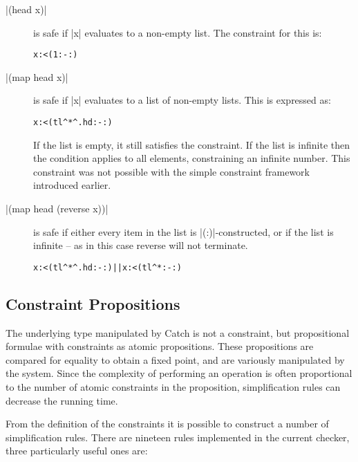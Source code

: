 \documentclass[preprint]{sigplanconf}
\newcommand{\C}[1]{\textsf{#1}}
\newenvironment{code}{\begin{alltt}\small}{\end{alltt}}
\begin{document}
\begin{description}
\item[|(head x)|] is safe if |x| evaluates to a non-empty list. The constraint for this is:

    \begin{code}
    x :< (1 :- {:})
    \end{code}

\item[|(map head x)|] is safe if |x| evaluates to a list of non-empty lists. This is expressed as:

    \begin{code}
    x :< (tl^* ^. hd :- {:})
    \end{code}

    If the list is empty, it still satisfies the constraint. If the list is infinite then the condition applies to all elements, constraining an infinite number. This constraint was not possible with the simple constraint framework introduced earlier.

\item[|(map head (reverse x))|] is safe if either every item in the list is |(:)|-constructed, or if the list is infinite -- as in this case \C{reverse} will not terminate.

    \begin{code}
    x :< (tl^* ^. hd :- {:}) || x :< (tl^* :- {:})
    \end{code}
\end{description}

\subsection{Constraint Propositions}

The underlying type manipulated by Catch is not a constraint, but propositional formulae with constraints as atomic propositions. These propositions are compared for equality to obtain a fixed point, and are variously manipulated by the system. Since the complexity of performing an operation is often proportional to the number of atomic constraints in the proposition, simplification rules can decrease the running time.

From the definition of the constraints it is possible to construct a number of simplification rules. There are nineteen rules implemented in the current checker, three particularly useful ones are:
\end{document}
